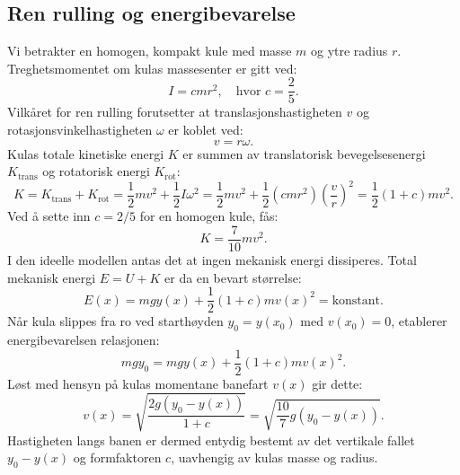 \documentclass[11pt,a4paper]{article}
\begin{document}
\subsection{Ren rulling og energibevarelse}
Vi betrakter en homogen, kompakt kule med masse $m$ og ytre radius $r$. Treghetsmomentet om kulas massesenter er gitt ved:
\begin{equation}
    I = c m r^2, \quad \text{hvor } c = \frac{2}{5}.
    \label{eq:moment_inertia}
\end{equation}
Vilkåret for ren rulling forutsetter at translasjonshastigheten $v$ og rotasjonsvinkelhastigheten $\omega$ er koblet ved:
\begin{equation}
    v = r\omega.
    \label{eq:pure_rolling}
\end{equation}
Kulas totale kinetiske energi $K$ er summen av translatorisk bevegelsesenergi $K_{\text{trans}}$ og rotatorisk energi $K_{\text{rot}}$:
\begin{equation}
    K = K_{\text{trans}} + K_{\text{rot}} = \frac{1}{2}mv^2 + \frac{1}{2}I\omega^2 = \frac{1}{2}mv^2 + \frac{1}{2}\left(c m r^2\right)\left(\frac{v}{r}\right)^2 = \frac{1}{2}(1 + c)mv^2.
\end{equation}
Ved å sette inn $c = 2/5$ for en homogen kule, fås:
\begin{equation}
    K = \frac{7}{10}mv^2.
    \label{eq:kin_energy}
\end{equation}
I den ideelle modellen antas det at ingen mekanisk energi dissiperes. Total mekanisk energi $E = U + K$ er da en bevart størrelse:
\begin{equation}
    E(x) = mgy(x) + \frac{1}{2}(1 + c)mv(x)^2 = \text{konstant}.
\end{equation}
Når kula slippes fra ro ved starthøyden $y_0 = y(x_0)$ med $v(x_0) = 0$, etablerer energibevarelsen relasjonen:
\begin{equation}
    mgy_0 = mgy(x) + \frac{1}{2}(1 + c)mv(x)^2.
\end{equation}
Løst med hensyn på kulas momentane banefart $v(x)$ gir dette:
\begin{equation}
    v(x) = \sqrt{\frac{2g\left(y_0 - y(x)\right)}{1 + c}} = \sqrt{\frac{10}{7}g\left(y_0 - y(x)\right)}.
    \label{eq:v_teor}
\end{equation}
Hastigheten langs banen er dermed entydig bestemt av det vertikale fallet $y_0 - y(x)$ og formfaktoren $c$, uavhengig av kulas masse og radius.
\end{document}

